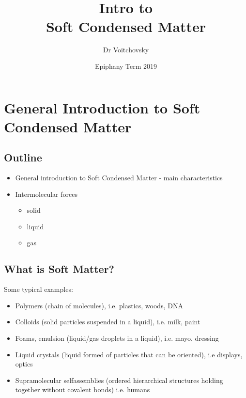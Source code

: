 \documentclass[a4paper, 11pt, normalem]{report}
\title{Intro to \\ Soft Condensed Matter \vspace{-20pt}}
\author{Dr Voitchovsky}
\date{\vspace{-15pt}Epiphany Term 2019}
\begin{document}
\maketitle
\tableofcontents

\chapter{General Introduction to Soft Condensed Matter}
\section{Outline}
\begin{itemize}
    \item General introduction to Soft Condensed Matter - main characteristics
    \item Intermolecular forces
        \begin{itemize}
            \item solid
            \item liquid
            \item gas
        \end{itemize}
\end{itemize}

\section{What is Soft Matter?}
Some typical examples:
\begin{itemize}
    \item Polymers (chain of molecules), i.e. plastics, woods, DNA
    \item Colloids (solid particles suspended in a liquid), i.e. milk, paint
    \item Foams, emulsion (liquid/gas droplets in a liquid), i.e. mayo, dressing
    \item Liquid crystals (liquid formed of particles that can be oriented), i.e displays, optics
    \item Supramolecular selfassemblies (ordered hierarchical structures holding together without covalent bonds) i.e. humans
\end{itemize}
\end{document}
